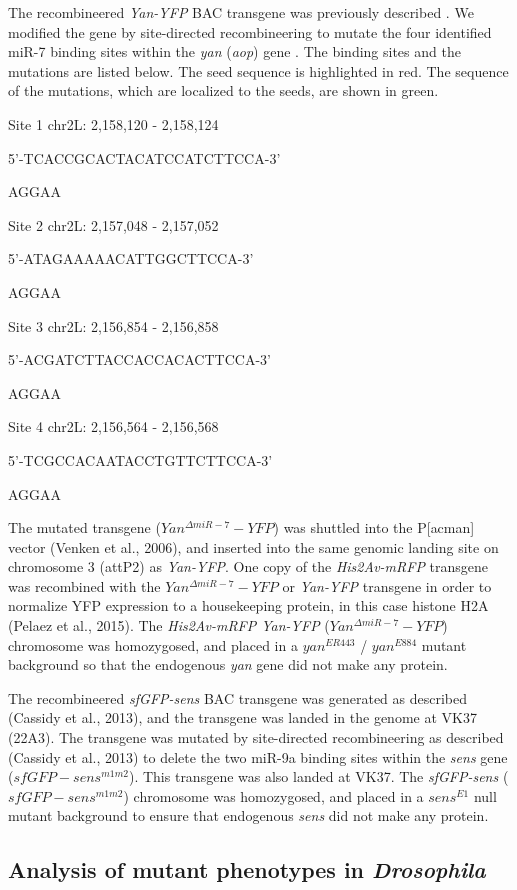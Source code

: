 The recombineered \textit{Yan-YFP} BAC transgene was previously described \cite{Webber2013}. We modified the gene by site-directed recombineering to mutate the four identified miR-7 binding sites within the \textit{yan} (\textit{aop}) gene \cite{Li2005}. The binding sites and the mutations are listed below. The seed sequence is highlighted in red. The sequence of the mutations, which are localized to the seeds, are shown in green.

Site 1 chr2L: 2,158,120 - 2,158,124

5'-TCACCGCACTACATCCATCTTCCA-3'

AGGAA

Site 2 chr2L: 2,157,048 - 2,157,052

5'-ATAGAAAAACATTGGCTTCCA-3'

AGGAA

Site 3 chr2L: 2,156,854 - 2,156,858

5'-ACGATCTTACCACCACACTTCCA-3'

AGGAA

Site 4 chr2L: 2,156,564 - 2,156,568

5'-TCGCCACAATACCTGTTCTTCCA-3'

AGGAA

The mutated transgene ($Yan^{\Delta miR-7}-YFP$) was shuttled into the P{[}acman{]} vector (Venken et al., 2006), and inserted into the same genomic landing site on chromosome 3 (attP2) as \textit{Yan-YFP}. One copy of the \textit{His2Av-mRFP} transgene was recombined with the $Yan^{\Delta miR-7}-YFP$ or \textit{Yan-YFP} transgene in order to normalize YFP expression to a housekeeping protein, in this case histone H2A (Pelaez et al., 2015). The \textit{His2Av-mRFP Yan-YFP} ($Yan^{\Delta miR-7}-YFP$) chromosome was homozygosed, and placed in a $yan^{ER443}$ / $yan^{E884}$ mutant background so that the endogenous \textit{yan} gene did not make any protein.

The recombineered \textit{sfGFP-sens} BAC transgene was generated as described (Cassidy et al., 2013), and the transgene was landed in the genome at VK37 (22A3). The transgene was mutated by site-directed recombineering as described (Cassidy et al., 2013) to delete the two miR-9a binding sites within the \textit{sens} gene ($sfGFP-sens^{m1m2}$). This transgene was also landed at VK37. The \textit{sfGFP-sens} ($sfGFP-sens^{m1m2}$) chromosome was homozygosed, and placed in a $sens^{E1}$ null mutant background to ensure that endogenous \textit{sens} did not make any protein.

\subsection{Analysis of mutant phenotypes in \textit{Drosophila}}
\label{appendix:methods:metabolism:phenotypes}

